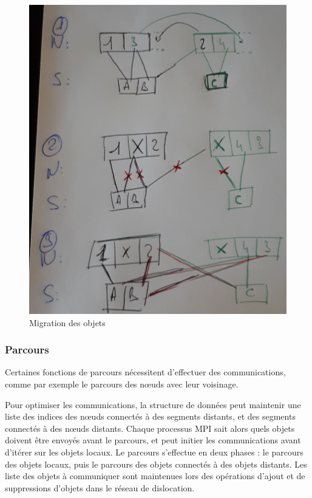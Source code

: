 \begin{figure}[H]
	\centering
	\includegraphics[height=0.3\textheight]{img/migration}
	\caption{Migration des objets}
	\label{fig:migration}
\end{figure}

\subsubsection{Parcours}

Certaines fonctions de parcours nécessitent d'effectuer des communications, comme par exemple le parcours des nœuds avec leur voisinage.

Pour optimiser les communications, la structure de données peut maintenir une liste des indices des nœuds connectés à des segments distants, et des segments connectés à des nœuds distants. Chaque processus MPI sait alors quels objets doivent être envoyés avant le parcours, et peut initier les communications avant d'itérer sur les objets locaux. Le parcours s'effectue en deux phases : le parcours des objets locaux, puis le parcours des objets connectés à des objets distants. Les liste des objets à communiquer sont maintenues lors des opérations d'ajout et de suppressions d'objets dans le réseau de dislocation.

